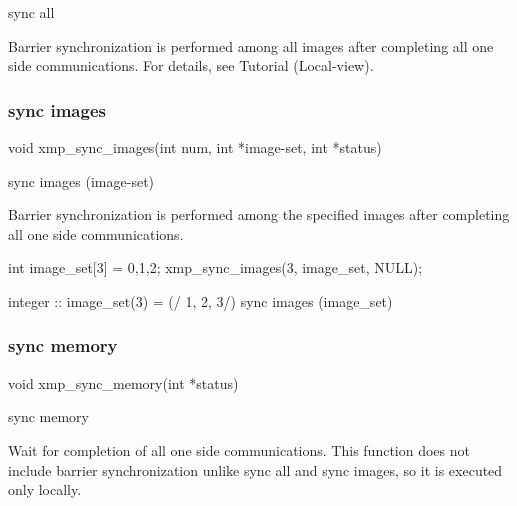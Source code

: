 \begin{XFexample}
sync all
\end{XFexample}

Barrier synchronization is performed among all images after completing
all one side communications. For details, see Tutorial (Local-view).

\subsubsection{sync images}

\begin{XCexample}
void xmp_sync_images(int num, int *image-set, int *status)
\end{XCexample}

\begin{XFexample}
sync images (image-set)
\end{XFexample}

Barrier synchronization is performed among the specified images after
completing all one side communications.

\begin{XCexample}
int image_set[3] = {0,1,2};
xmp_sync_images(3, image_set, NULL);
\end{XCexample}

\begin{XFexample}
integer :: image_set(3) = (/ 1, 2, 3/)
sync images (image_set)
\end{XFexample}

\subsubsection{sync memory}

\begin{XCexample}
void xmp_sync_memory(int *status)
\end{XCexample}

\begin{XFexample}
sync memory
\end{XFexample}

Wait for completion of all one side communications. This function does
not include barrier synchronization unlike sync all and sync images, so
it is executed only locally.




